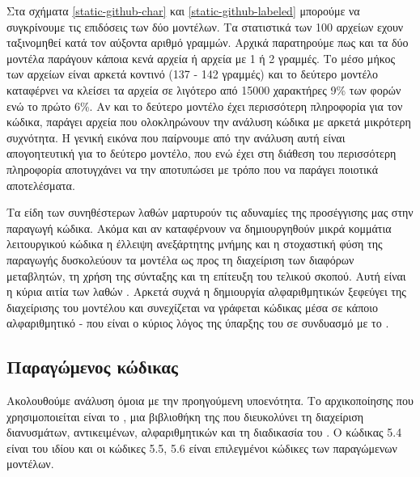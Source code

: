Στα σχήματα \ref{static-github-char} και \ref{static-github-labeled} μπορούμε να συγκρίνουμε τις επιδόσεις των δύο μοντέλων.
Τα στατιστικά των 100 αρχείων εχουν ταξινομηθεί κατά   τον αύξοντα αριθμό γραμμών.
Αρχικά παρατηρούμε πως και τα δύο μοντέλα παράγουν κάποια κενά αρχεία ή αρχεία με 1 ή 2 γραμμές.
Το μέσο μήκος των αρχείων είναι αρκετά κοντινό (137 - 142 γραμμές) και το δεύτερο μοντέλο καταφέρνει να κλείσει τα αρχεία σε λιγότερο από 15000 χαρακτήρες 9\% των φορών ενώ το πρώτο 6\%.
Αν και το δεύτερο μοντέλο έχει περισσότερη πληροφορία για τον κώδικα, παράγει αρχεία που ολοκληρώνουν την ανάλυση κώδικα με αρκετά μικρότερη συχνότητα.
Η γενική εικόνα που παίρνουμε από την ανάλυση αυτή είναι απογοητευτική για το δεύτερο μοντέλο, που ενώ έχει στη διάθεση του περισσότερη πληροφορία αποτυγχάνει να την αποτυπώσει με τρόπο που να παράγει ποιοτικά αποτελέσματα.

Τα είδη των συνηθέστερων λαθών μαρτυρούν τις αδυναμίες της προσέγγισης μας στην παραγωγή κώδικα.
Ακόμα και αν καταφέρνουν να δημιουργηθούν μικρά κομμάτια λειτουργικού κώδικα η έλλειψη ανεξάρτητης μνήμης και η στοχαστική φύση της παραγωγής δυσκολεύουν τα μοντέλα ως προς τη διαχείριση των διαφόρων μεταβλητών, τη χρήση της σύνταξης και τη επίτευξη του τελικού σκοπού.
Αυτή είναι η κύρια αιτία των λαθών .
Αρκετά συχνά η δημιουργία αλφαριθμητικών ξεφεύγει της διαχείρισης του μοντέλου και συνεχίζεται να γράφεται κώδικας μέσα σε κάποιο αλφαριθμητικό - που είναι ο κύριος λόγος της ύπαρξης του  σε συνδυασμό με το .

\subsection{ Παραγώμενος κώδικας}

Ακολουθούμε ανάλυση όμοια με την προηγούμενη υποενότητα.
Το  αρχικοποίησης που χρησιμοποιείται είναι το , μια βιβλιοθήκη της  που διευκολύνει τη διαχείριση διανυσμάτων, αντικειμένων, αλφαριθμητικών και τη διαδικασία του . Ο κώδικας 5.4 είναι του ιδίου  και οι κώδικες 5.5, 5.6 είναι επιλεγμένοι κώδικες των παραγώμενων μοντέλων. 



